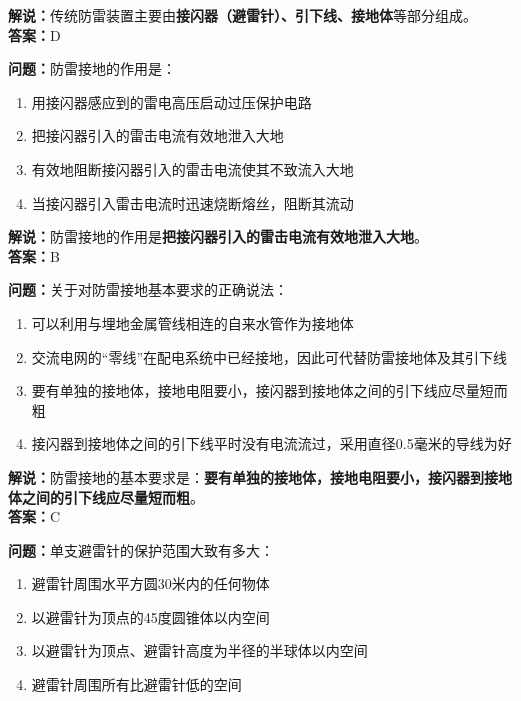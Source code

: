 \documentclass{ctexbook}
\begin{document}
\noindent\textbf{解说：}传统防雷装置主要由\textbf{接闪器（避雷针）、引下线、接地体}等部分组成。\\\noindent\textbf{答案：}D

\bigskip


\noindent\textbf{问题：}防雷接地的作用是：

\begin{enumerate}[label=\Alph*), leftmargin=3em]
	\item 用接闪器感应到的雷电高压启动过压保护电路
	\item 把接闪器引入的雷击电流有效地泄入大地
	\item 有效地阻断接闪器引入的雷击电流使其不致流入大地
	\item 当接闪器引入雷击电流时迅速烧断熔丝，阻断其流动
\end{enumerate}

\noindent\textbf{解说：}防雷接地的作用是\textbf{把接闪器引入的雷击电流有效地泄入大地}。\\\noindent\textbf{答案：}B


\bigskip


\noindent\textbf{问题：}关于对防雷接地基本要求的正确说法：

\begin{enumerate}[label=\Alph*), leftmargin=3em]
	\item 可以利用与埋地金属管线相连的自来水管作为接地体
	\item 交流电网的“零线”在配电系统中已经接地，因此可代替防雷接地体及其引下线
	\item 要有单独的接地体，接地电阻要小，接闪器到接地体之间的引下线应尽量短而粗
	\item 接闪器到接地体之间的引下线平时没有电流流过，采用直径0.5毫米的导线为好
\end{enumerate}

\noindent\textbf{解说：}防雷接地的基本要求是：\textbf{要有单独的接地体，接地电阻要小，接闪器到接地体之间的引下线应尽量短而粗}。\\\noindent\textbf{答案：}C%


\bigskip


\noindent\textbf{问题：}单支避雷针的保护范围大致有多大：

\begin{enumerate}[label=\Alph*), leftmargin=3em]
	\item 避雷针周围水平方圆30米内的任何物体
	\item 以避雷针为顶点的45度圆锥体以内空间
	\item 以避雷针为顶点、避雷针高度为半径的半球体以内空间
	\item 避雷针周围所有比避雷针低的空间
\end{enumerate}
\end{document}
